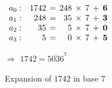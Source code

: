 \documentclass[11pt]{article}
\numberwithin{equation}{section}
\numberwithin{figure}{section}
\theoremstyle{definition}
\begin{document}
\begin{figure}
\hfill$\begin{array}{rr@{\hspace{1ex}}c@{\hspace{1ex}}r@{\hspace{1ex}}c@{\hspace{1ex}}c@{\hspace{1ex}}c@{\hspace{1ex}}c}
a_0: & 1742 & = & 248 & \times & 7 & + & \mathbf{6} \\
a_1: & 248 & = & 35 & \times & 7 & + & \mathbf{3} \\
a_2: & 35 & = & 5 & \times & 7 & + & \mathbf{0} \\
a_3: & 5 & = & 0 & \times & 7 & + & \mathbf{5} \\
\end{array}$
\hfill\null

\medskip

\hfill $\Longrightarrow$ \quad $1742 = \overline{5036}^7$\hfill\null

\caption{Expansion of $1742$ in base $7$}
\label{fig:decbasis}
\end{figure}
\end{document}
